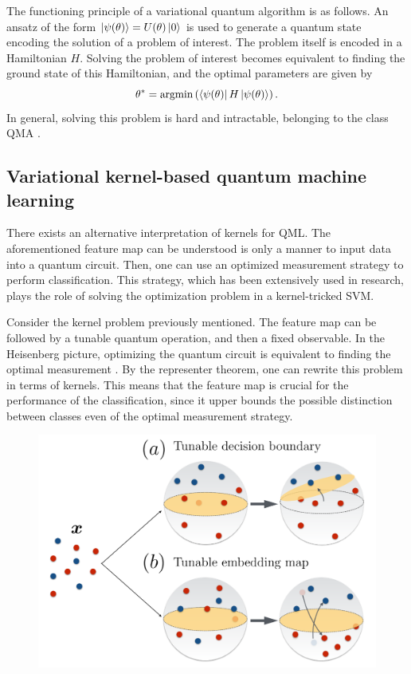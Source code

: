 \documentclass[]{report}
\begin{document}
The functioning principle of a variational quantum algorithm is as follows. An ansatz of the form $\ket{\psi(\theta)} = U(\theta)\ket 0$ is used to generate a quantum state encoding the solution of a problem of interest. The problem itself is encoded in a Hamiltonian $H$. Solving the problem of interest becomes equivalent to finding the ground state of this Hamiltonian, and the optimal parameters are given by
\begin{equation}
\theta^* = \operatorname{argmin}\left( \bra{\psi(\theta)}H\ket{\psi(\theta)}\right).
\end{equation}
In general, solving this problem is hard and intractable, belonging to the class QMA \cite{kempe2005complexity}.

\subsection{Variational kernel-based quantum machine learning}

There exists an alternative interpretation of kernels for QML. The aforementioned feature map can be understood is only a manner to input data into a quantum circuit. Then, one can use an optimized measurement strategy to perform classification. This strategy, which has been extensively used in research, plays the role of solving the optimization problem in a kernel-tricked SVM. 



Consider the kernel problem previously mentioned. The feature map can be followed by a tunable quantum operation, and then a fixed observable. In the Heisenberg picture, optimizing the quantum circuit is equivalent to finding the optimal measurement \cite{helstrom1976quantum}. By the representer theorem, one can rewrite this problem in terms of kernels. This means that the feature map is crucial for the performance of the classification, since it upper bounds the possible distinction between classes even of the optimal measurement strategy. 

\begin{figure}
\centering
\includegraphics[width = .6\linewidth]{images/berta}
\caption{}
\label{fig.berta}
\end{figure}
\end{document}
